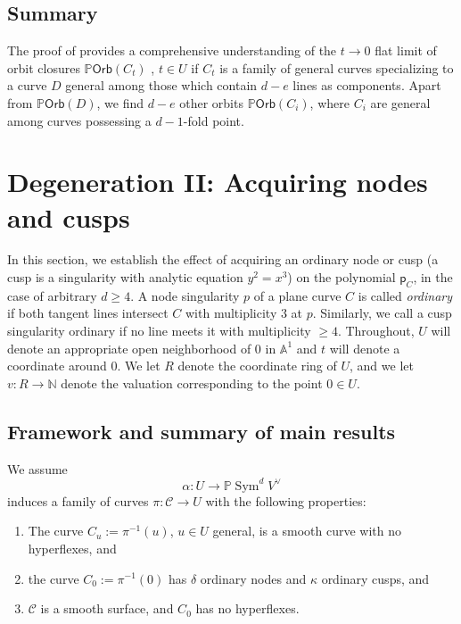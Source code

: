 \documentclass[12 pt, reqno]{amsart}
\theoremstyle{definition}
\newcommand{\on}{\operatorname}
\newcommand{\mb}{\mathbb}
\renewcommand{\P}{\mb{P}}
\newcommand{\Orb}{\mathsf{Orb}}
\newcommand{\p}{\mathsf{p}}
\begin{document}
\subsection{Summary}
The proof of  provides a comprehensive
understanding of the $t \to 0$ flat limit of orbit closures
$\P \Orb(C_{t})$ , $t \in U$ if $C_{t}$ is a family of general curves
specializing to a curve $D$ general among those which contain $d-e$
lines as components. Apart from $\P \Orb(D)$, we find $d-e$ other
orbits $\P \Orb(C_{i})$, where $C_{i}$ are general among curves
possessing a $d-1$-fold point.
































\section{Degeneration II: Acquiring nodes and cusps}
\label{sec:nodecusp}

In this section, we establish the effect of acquiring an ordinary node
or cusp (a cusp is a singularity with analytic equation $y^{2}=x^{3}$)
on the polynomial $\p_{C}$, in the case of arbitrary $d \geq 4$.  A
node singularity $p$ of a plane curve $C$ is called {\sl ordinary} if
both tangent lines intersect $C$ with multiplicity $3$ at
$p$. Similarly, we call a cusp singularity ordinary if no line meets
it with multiplicity $\geq 4$.  Throughout, $U$ will denote an
appropriate open neighborhood of $0$ in $\mb{A}^{1}$ and $t$ will
denote a coordinate around $0$. We let $R$ denote the coordinate ring
of $U$, and we let $v: R \to \mb{N}$ denote the valuation
corresponding to the point $0 \in U$.


\subsection{Framework and summary of main results}
\label{sec:frameworknodecusp}

We assume \[\alpha: U \to \P \on{Sym}^{d}V^{\vee}\] induces a family
of curves $\pi: \mathcal{C} \to U$ with the following properties:
  \begin{enumerate}
  \item The curve $C_{u} := \pi^{-1}(u)$, $u\in U$ general, is a
    smooth curve with no hyperflexes, and
  \item the curve $C_{0} := \pi^{-1}(0)$ has $\delta$ ordinary nodes
    and $\kappa$ ordinary cusps, and
  \item $\mathcal{C}$ is a smooth surface, and $C_{0}$ has no
    hyperflexes.
  \end{enumerate}
\end{document}
